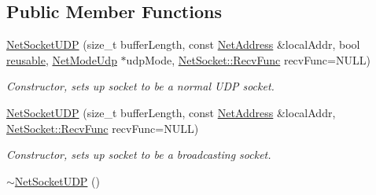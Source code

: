 \subsection*{Public Member Functions}
\begin{DoxyCompactItemize}
\item 
\hyperlink{class_net_socket_u_d_p_a8b8748e118b785882116dc19a84254b3}{NetSocketUDP} (size\_\-t bufferLength, const \hyperlink{class_net_address}{NetAddress} \&localAddr, bool \hyperlink{class_net_socket_simple_a0921fd02f526c403ce5143d8fdec77fa}{reusable}, \hyperlink{class_net_mode_udp}{NetModeUdp} $\ast$udpMode, \hyperlink{class_net_socket_a52b5f4de8d0a47fd8620f542b21c076c}{NetSocket::RecvFunc} recvFunc=NULL)
\begin{DoxyCompactList}\small\item\em Constructor, sets up socket to be a normal UDP socket. \item\end{DoxyCompactList}\item 
\hyperlink{class_net_socket_u_d_p_a670282569a94faca7a4467de127dbc68}{NetSocketUDP} (size\_\-t bufferLength, const \hyperlink{class_net_address}{NetAddress} \&localAddr, \hyperlink{class_net_socket_a52b5f4de8d0a47fd8620f542b21c076c}{NetSocket::RecvFunc} recvFunc=NULL)
\begin{DoxyCompactList}\small\item\em Constructor, sets up socket to be a broadcasting socket. \item\end{DoxyCompactList}\item 
\hypertarget{class_net_socket_u_d_p_a37a342442ddd2ae164aa143e827a0dcd}{
\hyperlink{class_net_socket_u_d_p_a37a342442ddd2ae164aa143e827a0dcd}{$\sim$NetSocketUDP} ()}
\label{class_net_socket_u_d_p_a37a342442ddd2ae164aa143e827a0dcd}


\end{DoxyCompactItemize}
